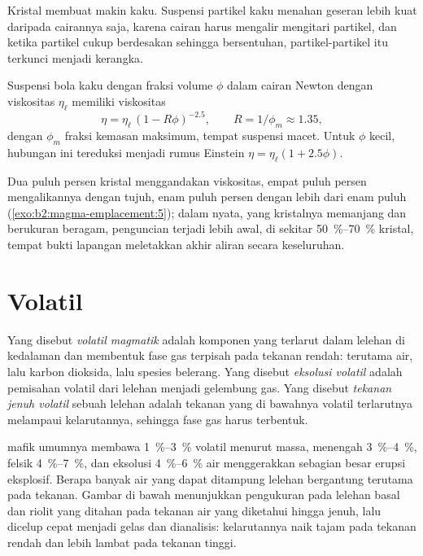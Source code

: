 Kristal membuat  makin kaku. Suspensi partikel kaku menahan
geseran lebih kuat daripada cairannya saja, karena cairan harus mengalir mengitari
partikel, dan ketika partikel cukup berdesakan sehingga bersentuhan, partikel-partikel itu terkunci menjadi
kerangka.

\begin{proposition}\label{prop:b2:magma-emplacement:roscoe}
Suspensi bola kaku dengan fraksi volume $\phi$ dalam cairan Newton
dengan viskositas $\eta_{\ell}$ memiliki viskositas
\[
\eta = \eta_{\ell}\,(1 - R\phi)^{-2.5}, \qquad R = 1/\phi_m \approx 1.35,
\]
dengan $\phi_m$ fraksi kemasan maksimum, tempat suspensi macet. Untuk
$\phi$ kecil, hubungan ini tereduksi menjadi rumus Einstein $\eta = \eta_{\ell}(1 + 2.5\phi)$.
\end{proposition}
\admitted

Dua puluh persen kristal menggandakan viskositas, empat puluh persen mengalikannya dengan
tujuh, enam puluh persen dengan lebih dari enam puluh (\cref{exo:b2:magma-emplacement:5}); dalam  nyata, yang
kristalnya memanjang dan berukuran beragam, penguncian terjadi lebih awal, di sekitar
\qtyrange{50}{70}{\percent} kristal, tempat bukti lapangan meletakkan
akhir aliran secara keseluruhan.

\section{Volatil}

\begin{definition}\label{def:b2:magma-emplacement:volatiles}
Yang disebut \emph{volatil magmatik} adalah komponen  yang
terlarut dalam lelehan di kedalaman dan membentuk fase gas terpisah pada tekanan
rendah: terutama air, lalu karbon dioksida, lalu spesies belerang. Yang disebut \emph{eksolusi
volatil} adalah pemisahan volatil dari
lelehan menjadi gelembung gas. Yang disebut \emph{tekanan jenuh
volatil} sebuah lelehan adalah tekanan yang di bawahnya
volatil terlarutnya melampaui kelarutannya, sehingga fase gas harus terbentuk.
\end{definition}

 mafik umumnya membawa \qtyrange{1}{3}{\percent} volatil menurut massa,
 menengah \qtyrange{3}{4}{\percent},  felsik
\qtyrange{4}{7}{\percent}, dan eksolusi \qtyrange{4}{6}{\percent}
air menggerakkan sebagian besar erupsi eksplosif. Berapa banyak air yang dapat ditampung lelehan bergantung
terutama pada tekanan. Gambar di bawah menunjukkan pengukuran pada lelehan basal dan
riolit yang ditahan pada tekanan air yang diketahui hingga jenuh, lalu dicelup cepat
menjadi gelas dan dianalisis: kelarutannya naik tajam pada tekanan rendah dan lebih
lambat pada tekanan tinggi.

